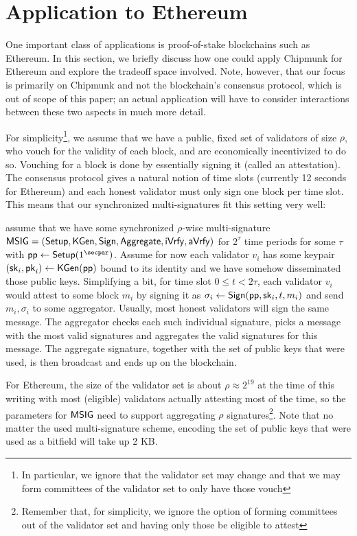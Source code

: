 \section{Application to Ethereum}\label{sec:ethereum}

One important class of applications is proof-of-stake blockchains such as Ethereum. %
In this section, we briefly discuss how one could apply Chipmunk for Ethereum and explore the tradeoff space involved.
Note, however, that our focus is primarily on Chipmunk and not the blockchain's consensus protocol, which is out of scope of this paper;
an actual application will have to consider interactions between these two aspects in much more detail.

For simplicity\footnote{In particular, we ignore that the validator set may change and that we may form committees of the validator set to only have those vouch}, we assume that we have a public, fixed set of validators of size $\rho$, who vouch for the validity of each block, and are economically incentivized to do so.
Vouching for a block is done by essentially signing it (called an attestation). The consensus protocol gives a natural notion of time slots (currently 12 seconds for Ethereum) and each honest validator must only sign one block per time slot. This means that our synchronized multi-signatures fit this setting very well:

assume that we have some synchronized $\rho$-wise multi-signature $\mathsf{MSIG} = (\mathsf{Setup}, \mathsf{KGen}, \mathsf{Sign}, \allowbreak \mathsf{Aggregate},\allowbreak \mathsf{iVrfy}, \mathsf{aVrfy})$ for $2^{\tau}$ time periods for some $\tau$ with $\params\gets\setup(1^{\secpar})$. Assume for now each validator $v_i$ has some keypair $(\mathsf{sk}_i,\mathsf{pk}_i)\gets \mathsf{KGen}(\mathsf{pp})$ bound to its identity and we have somehow disseminated those public keys.
Simplifying a bit, for time slot $0\leq t <2\tau$, each validator $v_i$ would attest to some block $m_i$ by signing it as $\sigma_i\gets\mathsf{Sign}(\mathsf{pp},\mathsf{sk}_i,t,m_i)$ and send $m_i, \sigma_i$ to some aggregator. Usually, most honest validators will sign the same message. The aggregator checks each such individual signature, picks a message with the most valid signatures and aggregates the valid signatures for this message. The aggregate signature, together with the set of public keys that were used, is then broadcast and ends up on the blockchain.

For Ethereum, the size of the validator set is about $\rho\approx 2^{19}$ at the time of this writing with most (eligible) validators actually attesting most of the time, so the parameters for $\mathsf{MSIG}$ need to support aggregating $\rho$ signatures\footnote{Remember that, for simplicity, we ignore the option of forming committees out of the validator set and having only those be eligible to attest}. Note that no matter the used multi-signature scheme, encoding the set of public keys that were used as a bitfield will take up 2 KB.

